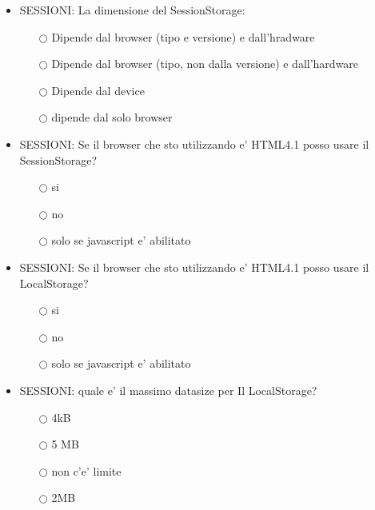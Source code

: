 \documentclass[10pt,twocolumn]{article}
\begin{document}
\begin{itemize}
    \item SESSIONI: La dimensione del SessionStorage:
          \begin{itemize}
              \item[$\bigcirc$] Dipende dal browser (tipo e versione) e dall'hradware
              \item[$\bigcirc$] Dipende dal browser (tipo, non dalla versione) e dall'hardware
              \item[$\bigcirc$] Dipende dal device
              \item[$\bigcirc$] dipende dal solo browser
          \end{itemize}
\end{itemize}
\begin{itemize}
    \item SESSIONI: Se il browser che sto utilizzando e' HTML4.1 posso usare il SessionStorage?
          \begin{itemize}
              \item[$\bigcirc$] si
              \item[$\bigcirc$] no
              \item[$\bigcirc$] solo se javascript e' abilitato
          \end{itemize}
\end{itemize}
\begin{itemize}
    \item SESSIONI: Se il browser che sto utilizzando e' HTML4.1 posso usare il LocalStorage?
          \begin{itemize}
              \item[$\bigcirc$] si
              \item[$\bigcirc$] no
              \item[$\bigcirc$] solo se javascript e' abilitato
          \end{itemize}
\end{itemize}
\begin{itemize}
    \item SESSIONI: quale e' il massimo datasize per Il LocalStorage?
          \begin{itemize}
              \item[$\bigcirc$] 4kB
              \item[$\bigcirc$] 5 MB
              \item[$\bigcirc$] non c'e' limite
              \item[$\bigcirc$] 2MB
          \end{itemize}
\end{itemize}
\end{document}
